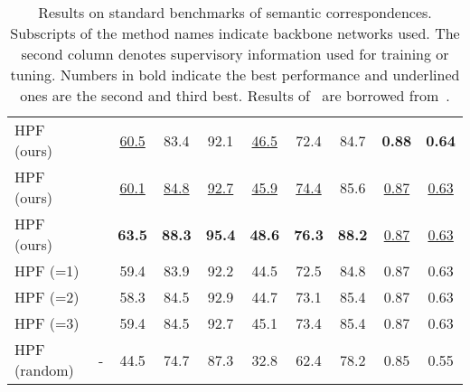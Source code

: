 \documentclass[10pt,twocolumn,letterpaper]{article}
\begin{document}
\begin{center}
\begin{table*}
\begin{center}
{\begin{tabular}{l|c|ccc|ccc|cc}
                \hline   
                HPF (ours)  &   & \underline{60.5} & 83.4 & 92.1 & \underline{46.5} & 72.4 & 84.7 & \textbf{0.88} & \textbf{0.64} \\
                HPF (ours)  &  & \underline{60.1} & \underline{84.8} & \underline{92.7} & \underline{45.9} & \underline{74.4} & 85.6 & \underline{0.87} & \underline{0.63} \\
                HPF (ours) & & \textbf{63.5} & \textbf{88.3} & \textbf{95.4} & \textbf{48.6} & \textbf{76.3} & \textbf{88.2} & \underline{0.87} & \underline{0.63} \\ 
\hline
                \hline
                HPF (=1)  &  & 59.4 & 83.9 & 92.2 & 44.5 & 72.5 & 84.8 & 0.87 & 0.63 \\
                HPF (=2)   &  & 58.3 & 84.5 & 92.9 & 44.7 & 73.1 & 85.4 & 0.87 & 0.63 \\
                HPF (=3)  & & 59.4 & 84.5 & 92.7 & 45.1 & 73.4 & 85.4 & 0.87 & 0.63 \\
                \hline
                HPF (random) & - & 44.5 & 74.7 & 87.3 & 32.8 & 62.4 & 78.2 & 0.85 & 0.55 \\
                \hline
                \end{tabular}
            }
            \vspace{-1.5mm}
            \caption{\label{tab:stdBenchmarkTable}Results on standard benchmarks of semantic correspondences. Subscripts of the method names indicate  backbone networks used.  The second column denotes supervisory information used for training or tuning.
            Numbers in bold indicate the best performance and underlined ones are the second and third best. Results of~\cite{ham2016proposal, han2017scnet, kim2017fcss, Rocco17, Rocco18} are borrowed from~\cite{NIPS2018_7851}.
            }
            \vspace{-3.5mm}
        \end{center}
    \end{table*}
\end{center}
\end{document}
